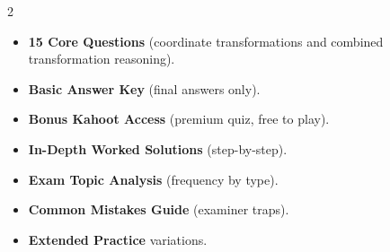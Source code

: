 \documentclass[11pt,a4paper]{article}
\newcommand{\FullReleaseDate}{April 30, 2026}
\begin{document}
\vspace{8pt}

\begin{multicols}{2}
  \begin{tcolorbox}[card, title=\sffamily\bfseries\textcolor{white}{\faHandPointDown\ TODAY (Simplified Version)}, colbacktitle=mainblue, boxed title style={sharp corners, boxrule=0pt}]
    \begin{itemize}[leftmargin=1.2em, itemsep=2pt]
      \item \small \textbf{15 Core Questions} (coordinate transformations and combined transformation reasoning).
      \item \small \textbf{Basic Answer Key} (final answers only).
      \item \small \textbf{Bonus Kahoot Access} (premium quiz, free to play).
    \end{itemize}
  \end{tcolorbox}

  \columnbreak

  \begin{tcolorbox}[card, title=\sffamily\bfseries\textcolor{white}{\faRocket\ ON \FullReleaseDate\ (Full Upgrade)}, colbacktitle=mainblue, boxed title style={sharp corners, boxrule=0pt}]
    \begin{itemize}[leftmargin=1.2em, itemsep=2pt]
      \item \small \textbf{In-Depth Worked Solutions} (step-by-step).
      \item \small \textbf{Exam Topic Analysis} (frequency by type).
      \item \small \textbf{Common Mistakes Guide} (examiner traps).
      \item \small \textbf{Extended Practice} variations.
    \end{itemize}
  \end{tcolorbox}
\end{multicols}
\end{document}
